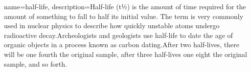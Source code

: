 { 
    name=half-life,
    description={Half-life (t1⁄2) is the amount of time required for the amount of something to fall to half its initial value. The term is very commonly used in nuclear physics to describe how quickly unstable atoms undergo radioactive decay.Archeologists and geologists use half-life to date the age of organic objects in a process known as carbon dating.After two half-lives, there will be one fourth the original sample, after three half-lives one eight the original sample, and so forth. }
}
